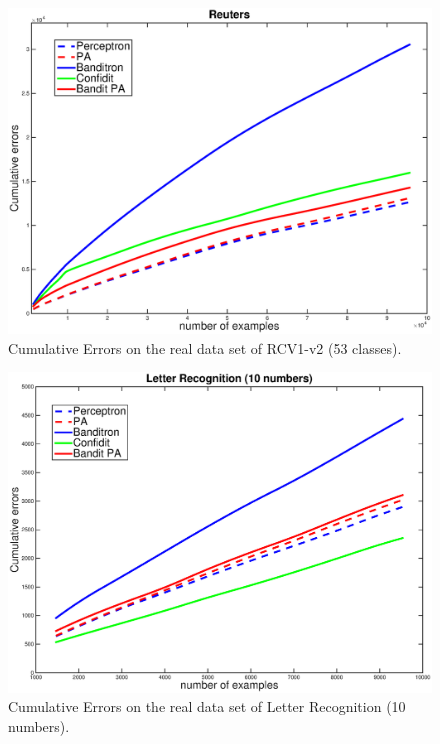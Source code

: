 \documentclass[preprint,12pt,authoryear]{elsarticle}
\begin{document}
\begin{figure}[h!]
	\centerline{
		\includegraphics[scale = 0.4]{figs/RCV1_v2_53class.eps}}
	\caption{Cumulative Errors  on the real data set of RCV1-v2 (53 classes).}
	\label{pic:BPARCV}
\end{figure}

\begin{figure}[h!]
	\centerline{
		\includegraphics[scale = 0.4]{figs/10LR.eps}}
	\caption{Cumulative Errors on the real data set of Letter Recognition (10 numbers).}
	\label{pic:BPALR10}
\end{figure}
\end{document}

